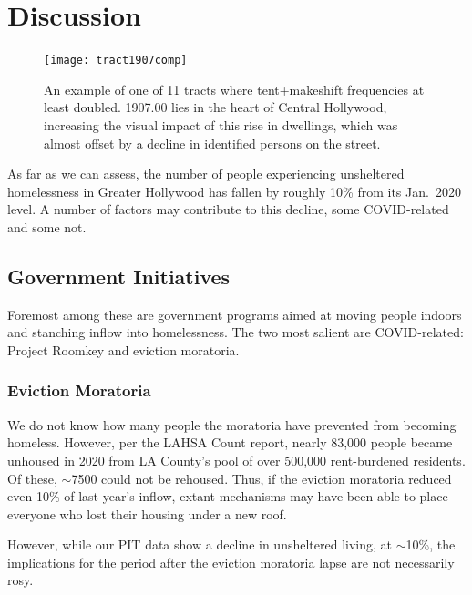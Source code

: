 \documentclass[11pt,twocolumn]{article}
\def\resp{respectively}
\begin{document}
\section{Discussion}
\label{sec:discussion}

\begin{figure}[t]
	\centering
	\texttt{[image: tract1907comp]}
	\caption{An example of one of 11 tracts where tent+makeshift frequencies at least 
			doubled. 1907.00 lies in the heart of Central Hollywood, increasing the visual impact of this
			rise in dwellings, which was almost offset by a decline in identified persons
			on the street.}
	\label{fig:1907}
\end{figure}

As far as we can assess, the number of people experiencing unsheltered
homelessness in Greater Hollywood has fallen by roughly 10\% from its Jan.~2020 level. A number of factors 
may contribute to this decline, some COVID-related and some not.

\subsection{Government Initiatives}

Foremost among these are government programs aimed at moving people indoors and stanching inflow into 
homelessness. The two most salient are COVID-related: Project Roomkey and eviction moratoria.

\subsubsection{Eviction Moratoria}

We do not know how many people the moratoria have prevented from becoming homeless. However,
per the LAHSA Count report, nearly 83,000 people became unhoused in 2020 from LA County's pool 
of over 500,000 rent-burdened residents. Of these, $\sim$7500 could not be rehoused. Thus, if the eviction
moratoria reduced even 10\% of last year's inflow, extant mechanisms may have been able to place 
everyone who lost their housing under a new roof.

However, while our PIT data show a decline in unsheltered living, at $\sim$10\%, the implications for 
the period \href{https://www.latimes.com/california/story/2021-01-12/new-report-foresees-tens-of-thousands-losing-homes-by-2023}
{after the eviction moratoria lapse} are not necessarily rosy.
\end{document}
